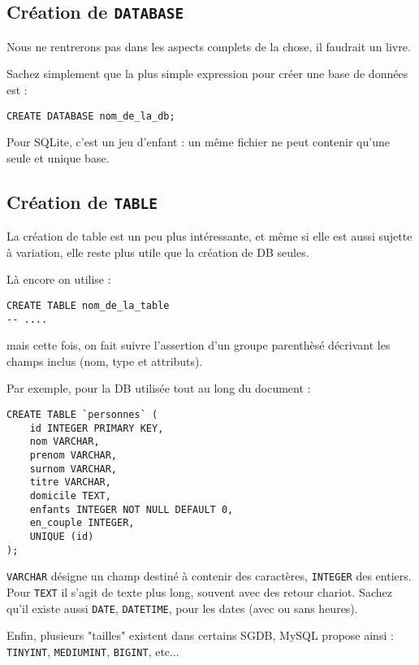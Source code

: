 \documentclass[a4paper, 11pt]{report}
\begin{document}
\subsection{Création de \texttt{DATABASE}}

Nous ne rentrerons pas dans les aspects complets de la chose, il faudrait un livre.

Sachez simplement que la plus simple expression pour créer une base de données est :

\begin{verbatim}
CREATE DATABASE nom_de_la_db;
\end{verbatim}

Pour SQLite, c'est un jeu d'enfant : un même fichier ne peut contenir qu'une seule et unique base.

\subsection{Création de \texttt{TABLE}}

La création de table est un peu plus intéressante, et même si elle est aussi sujette à variation, elle reste plus utile
que la création de DB seules.

Là encore on utilise :

\begin{verbatim}
CREATE TABLE nom_de_la_table
-- ....
\end{verbatim}


mais cette fois, on fait suivre l'assertion d'un groupe parenthèsé décrivant les champs inclus (nom, type et attributs).

Par exemple, pour la DB utilisée tout au long du document :

\begin{verbatim}
CREATE TABLE `personnes` (
    id INTEGER PRIMARY KEY,
    nom VARCHAR,
    prenom VARCHAR,
    surnom VARCHAR,
    titre VARCHAR,
    domicile TEXT,
    enfants INTEGER NOT NULL DEFAULT 0,
    en_couple INTEGER,
	UNIQUE (id)
);
\end{verbatim}

\texttt{VARCHAR} désigne un champ destiné à contenir des caractères, \texttt{INTEGER} des entiers.
Pour \texttt{TEXT} il s'agit de texte plus long, souvent avec des retour chariot.
Sachez qu'il existe aussi \texttt{DATE}, \texttt{DATETIME}, pour les dates (avec ou sans heures).

Enfin, plusieurs "tailles" existent dans certains SGDB, MySQL propose ainsi : \texttt{TINYINT}, \texttt{MEDIUMINT},
\texttt{BIGINT}, etc...
\end{document}
